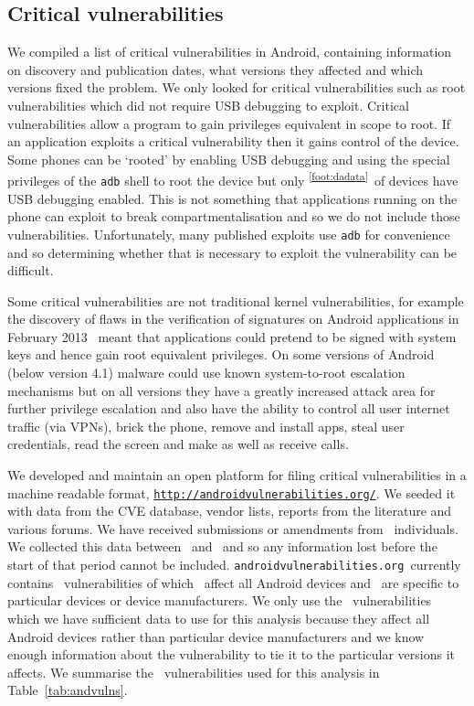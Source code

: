 \documentclass[conference,a4paper,twoside]{IEEEtran}
\let\OldTodo\todo
\renewcommand{\todo}{\OldTodo[inline]}
\newcommand{\todolater}[1]{}%
\newcommand{\dafoot}{\textsuperscript{\ref{foot:dadata}}}
\newcommand{\avo}{\texttt{androidvulnerabilities.org}}
\begin{document}
\subsection{Critical vulnerabilities}
We compiled a list of critical vulnerabilities in Android, containing information on discovery and publication dates, what versions they affected and which versions fixed the problem.
We only looked for critical vulnerabilities such as root vulnerabilities which did not require USB debugging to exploit.
Critical vulnerabilities allow a program to gain privileges equivalent in scope to root.
If an application exploits a critical vulnerability then it gains control of the device.
Some phones can be `rooted' by enabling USB debugging and using the special privileges of the \texttt{adb} shell to root the device but only \daAdbEnabledPerc\dafoot\ of devices have USB debugging enabled.
This is not something that applications running on the phone can exploit to break compartmentalisation and so we do not include those vulnerabilities.
Unfortunately, many published exploits use \texttt{adb} for convenience and so determining whether that is necessary to exploit the vulnerability can be difficult.

Some critical vulnerabilities are not traditional kernel vulnerabilities, for example the discovery of flaws in the verification of signatures on Android applications in February 2013~\cite{Forristal2013} meant that applications could pretend to be signed with system keys and hence gain root equivalent privileges.
On some versions of Android (below version 4.1) malware could use known system-to-root escalation mechanisms but on all versions they have a greatly increased attack area for further privilege escalation and also have the ability to control all user internet traffic (via VPNs), brick the phone, remove and install apps, steal user credentials, read the screen and make as well as receive calls.
\todolater{break vulnerabilities down by attack vector?}
\avoTabAndVulns

We developed and maintain an open platform for filing critical vulnerabilities in a machine readable format, \texttt{\url{http://androidvulnerabilities.org/}}.
We seeded it with data from the CVE database, vendor lists, reports from the literature and various forums.
We have received submissions or amendments from \avoNumSubmitters\ individuals.
We collected this data between \avoStartDate\ and \avoEndDate\ and so any information lost before the start of that period cannot be included.
\avo\ currently contains \avoNumVulnerabilities\ vulnerabilities of which \avoNumVulnAllAndroid\ affect all Android devices and \avoNumVulnSpecific\ are specific to particular devices or device manufacturers.
We only use the \daNumVulnsUsed\ vulnerabilities which we have sufficient data to use for this analysis because they affect all Android devices rather than particular device manufacturers and we know enough information about the vulnerability to tie it to the particular versions it affects.
We summarise the \daNumVulnsUsed\ vulnerabilities used for this analysis in Table~\ref{tab:andvulns}.\todolater{We have published full details of the \daNumVulnsUsed\ vulnerabilities used for this analysis in an accompanying technical report~\cite{TODO}}
\end{document}
